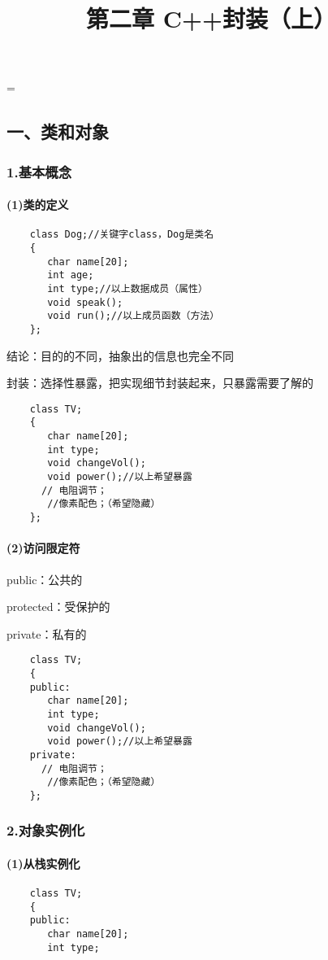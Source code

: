 \documentclass{article}
\begin{document}
 
\hfuzz=\maxdimen
{}
\begin{CJK}{UTF8}{gbsn}  
\title{第二章  C++封装（上）}
\author{}
\date{}
\maketitle
\part*{一、类和对象}
\section*{1.基本概念}
\subsection*{(1)类的定义}
\begin{verbatim}
    class Dog;//关键字class，Dog是类名
    {
       char name[20];
       int age;
       int type;//以上数据成员（属性）
       void speak();
       void run();//以上成员函数（方法）
    };
\end{verbatim}
\subparagraph*{}
结论：目的的不同，抽象出的信息也完全不同
\subparagraph*{}
封装：选择性暴露，把实现细节封装起来，只暴露需要了解的
\begin{verbatim}
    class TV;
    {
       char name[20];
       int type;
       void changeVol();
       void power();//以上希望暴露
      // 电阻调节；
       //像素配色；（希望隐藏）
    };
\end{verbatim}
\subsection*{(2)访问限定符}
\subparagraph*{}
public：公共的
\subparagraph*{}
protected：受保护的
\subparagraph*{}
private：私有的
\begin{verbatim}
    class TV;
    {
    public:
       char name[20];
       int type;
       void changeVol();
       void power();//以上希望暴露
    private:
      // 电阻调节；
       //像素配色；（希望隐藏）
    };
\end{verbatim}
\section*{2.对象实例化}
\subsection*{(1)从栈实例化}
\begin{verbatim}
    class TV;
    {
    public:
       char name[20];
       int type;
       

\end{verbatim}
\end{CJK}
\end{document}
